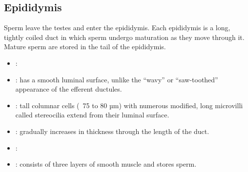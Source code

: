\subsection{Epididymis}
Sperm leave the testes and enter the epididymis. Each epididymis is a long, tightly coiled duct in which sperm undergo maturation as they move through it. Mature sperm are stored in the tail of the epididymis.
\begin{center}
\end{center}
\bigskip
\begin{multicols}{2}
\begin{itemize}
  \item {}:
  
  \begin{center}
  \end{center}
  
  \item {}:  has a smooth luminal surface, unlike the ``wavy'' or ``saw-toothed'' appearance of the efferent ductules. 
  
  \begin{center}
  \end{center}
  
  \item {}: tall columnar cells (~75 to 80 µm) with numerous modified, long microvilli called stereocilia extend from their luminal surface.
  
  \begin{center}
  \end{center}
  
  \item {}: gradually increases in thickness through the length of the duct. 
  
  \begin{center}
  \end{center}
  
  \item {}:
  
  \begin{center}
  \end{center}
  
  \item {}: consists of three layers of smooth muscle and stores sperm.
  
  \begin{center}
  \end{center}

\end{itemize}
\end{multicols}


